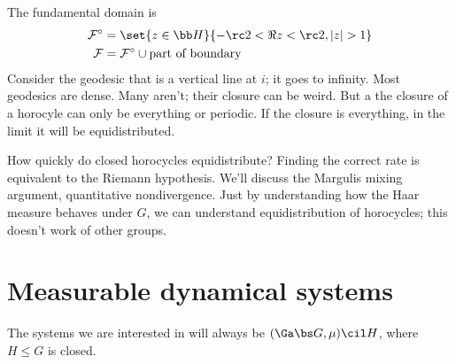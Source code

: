 

The fundamental domain is
\begin{align}
\cal F^{\circ} &= \set{z\in \bb H}{-\rc 2<\Re z<\rc 2, |z|>1}\\
\cal F &= \cal F^{\circ} \cup \text{part of boundary}
\end{align}
Consider the geodesic that is a vertical line at $i$; it goes to infinity. Most geodesics are dense. Many aren't; their closure can be weird. %
But a the closure of a horocyle can only be everything or periodic. If the closure is everything, in the limit it will be equidistributed. 

How quickly do closed horocycles equidistribute?  Finding the correct rate is equivalent to the Riemann hypothesis. 
We'll discuss the 
Margulis mixing argument, quantitative nondivergence.
Just by understanding how the Haar measure behaves under $G$, we can understand equidistribution of horocycles; this doesn't work of other groups.

\section{Measurable dynamical systems}

The systems we are interested in will always be $(\Ga\bs G, \mu)\cil H$, where $H\le G$ is closed. 

